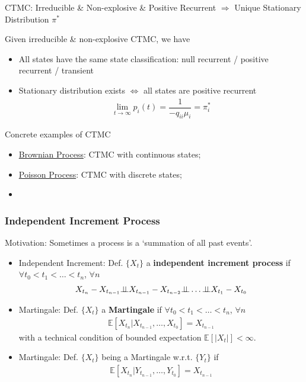 \begin{point}
    CTMC: Irreducible \& Non-explosive \& Positive Recurrent $ \Rightarrow  $ Unique Stationary Distribution $ \pi^* $
\end{point}

Given irreducible \& non-explosive CTMC, we have
\begin{itemize}[topsep=2pt,itemsep=0pt]
    \item All states have the same state classification: null recurrent / positive recurrent / transient
    \item Stationary distribution exists $ \Leftrightarrow $ all states are positive recurrent
    \begin{align}
        \lim_{t\to\infty}p_i(t)=\dfrac{1}{-q_{ii}\mu _i} = \pi^*_i
    \end{align}
\end{itemize}


\begin{point}
    Concrete examples of CTMC
\end{point}
\begin{itemize}[topsep=2pt,itemsep=0pt]
    \item \hyperlink{BrownianProcess}{Brownian Process}: CTMC with continuous states;
    \item \hyperlink{PoissonProcess}{Poisson Process}: CTMC with discrete states;
    \item 
\end{itemize}


\subsubsection{Independent Increment Process}\label{SubSubSectionIndepedentProcess}

Motivation: Sometimes a process is a `summation of all past events'.

\begin{itemize}[topsep=2pt,itemsep=0pt]
    \item Independent Increment: Def. $ \{X_t\} $ a \textbf{independent increment process} if $ \forall t_0<t_1<\ldots<t_n $, $ \forall n $
\begin{align}
    X_{t_{n}}-X_{t_{n-1}}\independent X_{t_{n-1}}-X_{t_{n-2}} \independent \ldots\independent X_{t_1}-X_{t_0}
\end{align}
    \item Martingale: Def. $ \{X_t\}  $ a \textbf{Martingale} if $ \forall t_0<t_1<\ldots<t_n $, $ \forall n $
    \begin{align}
        \mathbb{E}\left[ X_{t_n}|X_{t_{n-1}},\ldots,X_{t_0} \right] = X_{t_{n-1}} 
    \end{align}
    with a technical condition of bounded expectation $ \mathbb{E}\left[ |X_t| \right] <\infty $.
    \item Martingale: Def. $ \{X_t\}  $ being a Martingale w.r.t. $ \{Y_t\} $ if
    \begin{align}
        \mathbb{E}\left[ X_{t_n}|Y_{t_{n-1}},\ldots,Y_{t_0} \right] = X_{t_{n-1}} 
    \end{align}
\end{itemize}

